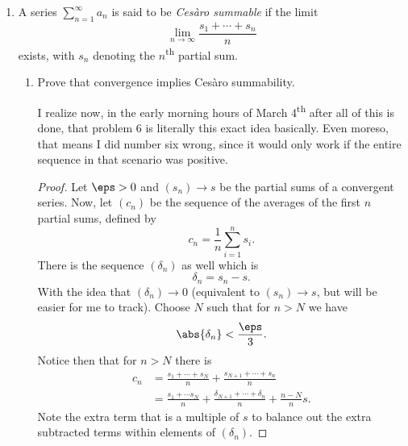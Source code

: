 \documentclass{article}
\begin{document}
\begin{enumerate}
  \item A series $\displaystyle\sum_{n = 1}^{\infty}a_{n}$ is said to be \emph{Ces\`aro summable} if the limit
        \[ \lim_{n \to \infty} \frac{s_{1} + \cdots + s_{n}}{n} \]
        exists, with $s_{n}$ denoting the $n$\textsuperscript{th} partial sum.
        \begin{enumerate}
          \item Prove that convergence implies Ces\`aro summability.

                I realize now, in the early morning hours of March 4\textsuperscript{th} after all of this is done,
                that problem 6 is literally this exact idea basically. Even moreso, that means I did number six wrong, since it would only work
                if the entire sequence in that scenario was positive.
                \begin{proof}
                  Let $\eps > 0$ and $(s_{n}) \to s$ be the partial sums of a convergent series.
                  Now, let $(c_{n})$ be the sequence of the averages of the first $n$ partial sums, defined by
                  \[ c_{n} = \frac{1}{n}\sum_{i = 1}^{n}s_{i}. \]
                  There is the sequence $(\delta_{n})$ as well which is
                  \[ \delta_{n} = s_{n} - s. \]
                  With the idea that $(\delta_{n}) \to 0$ (equivalent to $(s_{n}) \to s$, but will be easier for me to track).
                  Choose $N$ such that for $n > N$ we have
                  \[ \abs{\delta_{n}} < \frac{\eps}{3}. \]
                  Notice then that for $n > N$ there is
                  \begin{align*}
                    c_{n} &= \frac{s_{1} + \cdots + s_{N}}{n} + \frac{s_{N + 1} + \cdots + s_{n}}{n}\\
                    &= \frac{s_{1} + \cdots s_{N}}{n} + \frac{\delta_{N + 1} + \cdots + \delta_{n}}{n} + \frac{n - N}{n}s.
                  \end{align*}
                  Note the extra term that is a multiple of $s$ to balance out the extra subtracted terms within elements of $(\delta_{n})$.


\end{proof}
\end{enumerate}
\end{enumerate}
\end{document}
